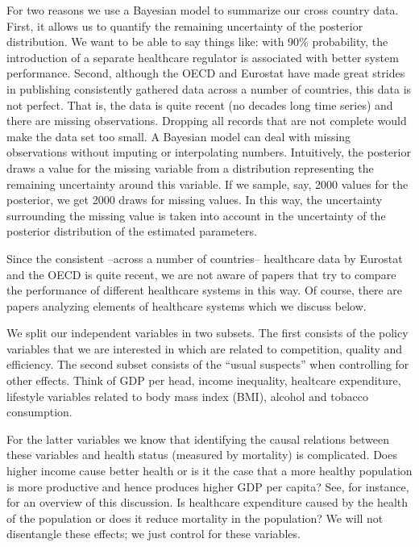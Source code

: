 \documentclass[a4paper,12pt]{article}
\begin{document}
For two reasons we use a Bayesian model to summarize our cross country data. First, it allows us to quantify the remaining uncertainty of the posterior distribution. We want to be able to say things like: with 90\% probability, the introduction of a separate healthcare regulator is associated with better system performance. Second, although the OECD and Eurostat have made great strides in publishing consistently gathered data across a number of countries, this data is not perfect. That is, the data is quite recent (no decades long time series) and there are missing observations. Dropping all records that are not complete would make the data set too  small. A Bayesian model can deal with missing observations without imputing or interpolating numbers. Intuitively, the posterior draws a value for the missing variable from a distribution representing the remaining uncertainty around this variable. If we sample, say, 2000 values for the posterior, we get 2000 draws for missing values. In this way, the uncertainty surrounding the missing value is taken into account in the uncertainty of the posterior distribution of the estimated parameters.

Since the consistent --across a number of countries-- healthcare data by Eurostat and the OECD is quite recent, we are not aware of papers that try to compare the performance of different healthcare systems in this way. Of course, there are papers analyzing elements of healthcare systems which we discuss below.

We split our independent variables in two subsets. The first consists of the policy variables that we are interested in which are related to competition, quality and efficiency. The second subset consists of the ``usual suspects'' when controlling for other effects. Think of GDP per head, income inequality, healtcare expenditure, lifestyle variables related to body mass index (BMI), alcohol and tobacco consumption.

For the latter variables we know that identifying the causal relations between these variables and health status (measured by mortality) is complicated. Does higher income cause better health or is it the case that a more healthy population is more productive and hence produces higher GDP per capita? See, for instance, \cite{socioeconomicstatus} for an overview of this discussion. Is healthcare expenditure caused by the health of the population or does it reduce mortality in the population? We will not disentangle these effects; we just control for these variables.
\end{document}
